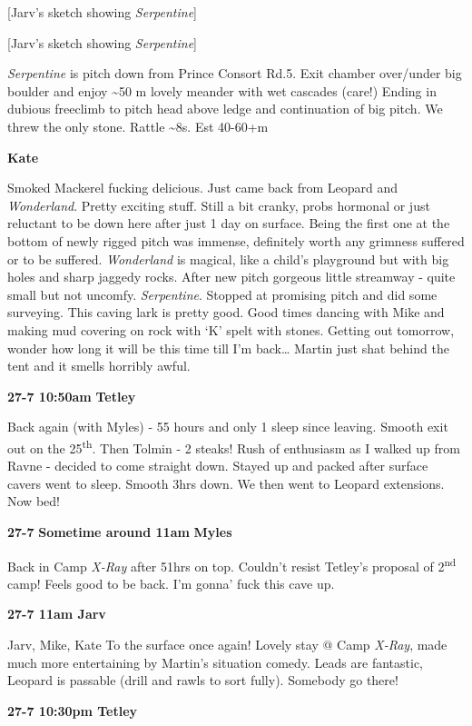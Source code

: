 {[}Jarv's sketch showing \emph{Serpentine}{]}

{[}Jarv's sketch showing \emph{Serpentine}{]}

\emph{Serpentine} is pitch down from Prince Consort Rd.5. Exit chamber
over/under big boulder and enjoy \textasciitilde 50 m lovely meander
with wet cascades (care!) Ending in dubious freeclimb to pitch head
above ledge and continuation of big pitch. We threw the only stone.
Rattle \textasciitilde 8s. Est 40-60+m

\textbf{Kate}

Smoked Mackerel fucking delicious. Just came back from Leopard and
\emph{Wonderland}. Pretty exciting stuff. Still a bit cranky, probs
hormonal or just reluctant to be down here after just 1 day on surface.
Being the first one at the bottom of newly rigged pitch was immense,
definitely worth any grimness suffered or to be suffered.
\emph{Wonderland} is magical, like a child's playground but with big
holes and sharp jaggedy rocks. After new pitch gorgeous little streamway
- quite small but not uncomfy. \emph{Serpentine}. Stopped at promising
pitch and did some surveying. This caving lark is pretty good. Good
times dancing with Mike and making mud covering on rock with `K' spelt
with stones. Getting out tomorrow, wonder how long it will be this time
till I'm back\ldots{} Martin just shat behind the tent and it smells
horribly awful.

\textbf{27-7 10:50am} \textbf{Tetley}

Back again (with Myles) - 55 hours and only 1 sleep since leaving.
Smooth exit out on the 25\textsuperscript{th}. Then Tolmin - 2 steaks!
Rush of enthusiasm as I walked up from Ravne - decided to come straight
down. Stayed up and packed after surface cavers went to sleep. Smooth
3hrs down. We then went to Leopard extensions. Now bed!

\textbf{27-7} \textbf{Sometime around 11am} \textbf{Myles}

Back in Camp \emph{X-Ray} after 51hrs on top. Couldn't resist Tetley's
proposal of 2\textsuperscript{nd} camp! Feels good to be back. I'm
gonna' fuck this cave up.

\textbf{27-7 11am Jarv}

Jarv, Mike, Kate To the surface once again! Lovely stay @ Camp
\emph{X-Ray}, made much more entertaining by Martin's situation comedy.
Leads are fantastic, Leopard is passable (drill and rawls to sort
fully). Somebody go there!

\textbf{27-7 10:30pm Tetley}

